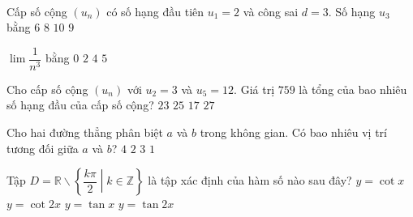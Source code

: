﻿﻿\begin{name}
	{\tenchude}
	{\tendethi}
	{\tentruong}
	{\thoigian}
\end{name}
\setcounter{ex}{0}\setcounter{bt}{0}
\begin{ex}%
	Cấp số cộng $(u_n)$ có số hạng đầu tiên $u_1=2$ và công sai $d=3$. Số hạng $u_3$ bằng
	\choice
	{$6$}
	{\True $8$}
	{$10$}
	{$9$}
\end{ex}

\begin{ex}%
	$\lim\dfrac{1}{n^3}$ bằng
	\choice
	{\True $0$}
	{$2$}
	{$4$}
	{$5$}
\end{ex}

\begin{ex}%
	Cho cấp số cộng $(u_n)$ với $u_2=3$ và $u_5=12$. Giá trị $759$ là tổng của bao nhiêu số hạng đầu của cấp số cộng?
	\choice
	{\True $23$}
	{$25$}
	{$17$}
	{$27$}
\end{ex}

\begin{ex}%
	Cho hai đường thẳng phân biệt $a$ và $b$ trong không gian. Có bao nhiêu vị trí tương đối giữa $a$ và $b$?
	\choice
	{$4$}
	{$2$}
	{\True $3$}
	{$1$}
\end{ex}

\begin{ex}%
	Tập $D=\mathbb{R}\backslash \left\{ \dfrac{k\pi }{2}\middle| k\in \mathbb{Z} \right\}$ là tập xác định của hàm số nào sau đây?
	\choice
	{ $y=\cot x$}
	{\True  $y=\cot 2x$}
	{ $y=\tan x$}
	{ $y=\tan 2x$}
\end{ex}

